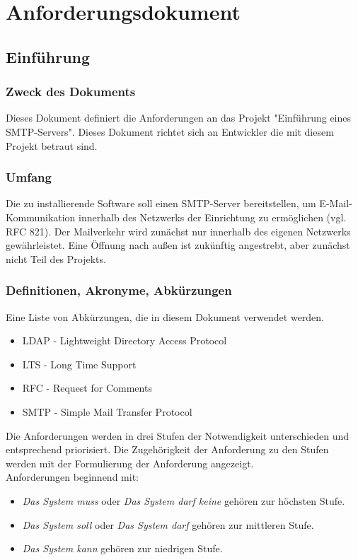 \appendix
\renewcommand\chaptername{Anhang}


\chapter{Anforderungsdokument}
\label{ch:Anhang}

\section{Einführung}
\subsection{Zweck des Dokuments}
Dieses Dokument definiert die Anforderungen an das Projekt "Einführung eines SMTP-Servers". 
Dieses Dokument richtet sich an Entwickler die mit diesem Projekt betraut sind.

\subsection{Umfang}
Die zu installierende Software soll einen SMTP-Server bereitstellen, um E-Mail-Kommunikation innerhalb des Netzwerks der Einrichtung zu ermöglichen (vgl. RFC 821). Der Mailverkehr wird zunächst nur innerhalb des eigenen Netzwerks gewährleistet. Eine Öffnung nach außen ist zukünftig angestrebt, aber zunächst nicht Teil des Projekts.

\subsection{Definitionen, Akronyme, Abkürzungen}
\label{ch:Definition}
Eine Liste von Abkürzungen, die in diesem Dokument verwendet werden.
\begin{itemize}
	\item LDAP - Lightweight Directory Access Protocol
	\item LTS - Long Time Support
	\item RFC - Request for Comments
	\item SMTP - Simple Mail Transfer Protocol
\end{itemize}

Die Anforderungen werden in drei Stufen der Notwendigkeit unterschieden und entsprechend priorisiert. Die Zugehörigkeit der Anforderung zu den Stufen werden mit der Formulierung der Anforderung angezeigt.\\
Anforderungen beginnend mit:
\begin{itemize}
	\item \textit{Das System muss} oder \textit{Das System darf keine} gehören zur höchsten Stufe.
	\item \textit{Das System soll} oder \textit{Das System darf} gehören zur mittleren Stufe.
	\item \textit{Das System kann} gehören zur niedrigen Stufe.
\end{itemize}

